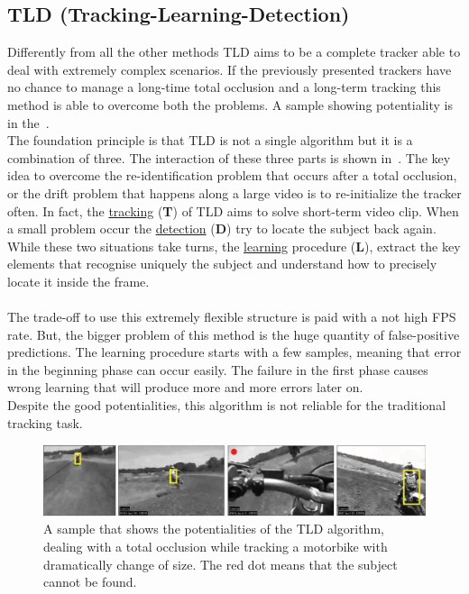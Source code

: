 \subsection{TLD (Tracking-Learning-Detection)}
Differently from all the other methods TLD\cite{tld} aims to be a complete tracker able to deal with extremely complex scenarios. If the previously presented trackers have no chance to manage a long-time total occlusion and a long-term tracking this method is able to overcome both the problems. A sample showing potentiality is in the~.\\
The foundation principle is that TLD is not a single algorithm but it is a combination of three. The interaction of these three parts is shown in~. The key idea to overcome the re-identification problem that occurs after a total occlusion, or the drift problem that happens along a large video is to re-initialize the tracker often. In fact, the \underline{tracking} (\textbf{T}) of TLD aims to solve short-term video clip. When a small problem occur the \underline{detection} (\textbf{D}) try to locate the subject back again. While these two situations take turns, the \underline{learning} procedure (\textbf{L}), extract the key elements that recognise uniquely the subject and understand how to precisely locate it inside the frame.\\
\\
The trade-off to use this extremely flexible structure is paid with a not high FPS rate. But, the bigger problem of this method is the huge quantity of false-positive predictions. The learning procedure starts with a few samples, meaning that error in the beginning phase can occur easily. The failure in the first phase causes wrong learning that will produce more and more errors later on.\\
Despite the good potentialities, this algorithm is not reliable for the traditional tracking task.
\begin{figure}[!h]
	\centering
	\includegraphics[width=1\linewidth]{images/tracking/sample_TLD}
	\caption{A sample that shows the potentialities of the TLD algorithm, dealing with a total occlusion while tracking a motorbike with dramatically change of size. The red dot means that the subject cannot be found.}
	\label{fig:sample_TLD}
\end{figure}



